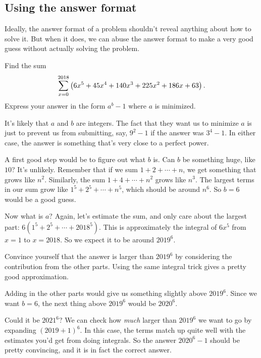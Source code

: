 \documentclass[11pt,paper=letter]{scrartcl}
\begin{document}
\subsection{Using the answer format}

Ideally, the answer format of a problem shouldn't reveal anything about how to solve it. But when it does, we can abuse the answer format to make a very good guess without actually solving the problem.

\begin{exboxed}
  \label{ex:sipnayan}
  Find the sum $$\displaystyle \sum_{x = 0}^{2018} \left( 6x^5 + 45 x^4 + 140x^3 + 225 x^2 + 186x + 63 \right).$$ Express your answer in the form $a^b - 1$ where $a$ is minimized. %
\end{exboxed}

It's likely that $a$ and $b$ are integers. The fact that they want us to minimize $a$ is just to prevent us from submitting, say, $9^2 - 1$ if the answer was $3^4 - 1$. In either case, the answer is something that's very close to a perfect power.

A first good step would be to figure out what $b$ is. Can $b$ be something huge, like $10$? It's unlikely. Remember that if we sum $1 + 2 + \cdots + n$, we get something that grows like $n^2$. Similarly, the sum $1 + 4 + \cdots + n^2$ grows like $n^3$. The largest terms in our sum grow like $1^5 + 2^5 + \cdots + n^5$, which should be around $n^6$. So $b = 6$ would be a good guess.

Now what is $a$? Again, let's estimate the sum, and only care about the largest part: $6\left(1^5 + 2^5 + \cdots + 2018^5\right)$. This is approximately the integral of $6x^5$ from $x = 1$ to $x = 2018$. So we expect it to be around $2019^6$.

\begin{exrboxed}
  Convince yourself that the answer is larger than $2019^6$ by considering the contribution from the other parts. Using the same integral trick gives a pretty good approximation.
\end{exrboxed}

Adding in the other parts would give us something slightly above $2019^6$. Since we want $b = 6$, the next thing above $2019^6$ would be $2020^6$.

Could it be $2021^6$? We can check how \textit{much} larger than $2019^6$ we want to go by expanding $(2019 + 1)^6$. In this case, the terms match up quite well with the estimates you'd get from doing integrals. So the answer $2020^6 - 1$ should be pretty convincing, and it is in fact the correct answer.
\end{document}

